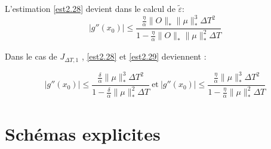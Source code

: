 L'estimation \eqref{est2.28} devient dans le calcul de $\tilde{\varepsilon}$:
\begin{equation} \label{est2.29}
|g''(x_0)| \leq \frac{\frac{\eta}{\alpha} \lVert O\rVert_* \lVert \mu \rVert _*^3 \Delta T^2 }{1-\frac{\eta}{\alpha} \lVert O\rVert_* \lVert \mu \rVert _*^2 \Delta T}
\end{equation}

Dans le cas de $ J_{\Delta T,1} $ , \eqref{est2.28} et \eqref{est2.29} deviennent :

$$ |g''(x_0)| \leq \frac{\frac{\delta}{\alpha}  \lVert \mu \rVert _*^3 \Delta T^2 }{1-\frac{\delta}{\alpha}  \lVert \mu \rVert _*^2 \Delta T}    \ \text{et}\    |g''(x_0)| \leq \frac{\frac{\eta}{\alpha} \lVert \mu \rVert _*^3 \Delta T^2 }{1-\frac{\eta}{\alpha} \lVert \mu \rVert _*^2 \Delta T} $$ 

\section{Schémas explicites}


